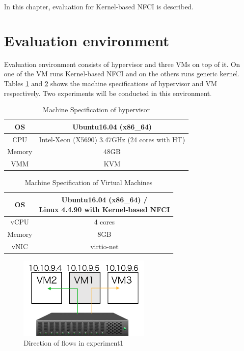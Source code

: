 In this chapter, evaluation for Kernel-based NFCI is described. 
\section{Evaluation environment}
Evaluation environment consists of hypervisor and three VMs on top of it. On one of the VM runs Kernel-based NFCI and on the others runs generic kernel. Tables \ref{tbl: spec1} and \ref{tbl: spec2} shows the machine specifications of hypervisor and VM respectively. Two experiments will be conducted in this environment.  

\begin{table}
	\centering
	\begin{tabular}{|c||c|}
		\hline
		OS & Ubuntu16.04 (x86\_64) \\
		\hline
		CPU & Intel-Xeon (X5690) 3.47GHz (24 cores with HT) \\
		\hline
		Memory & 48GB \\
		\hline
		VMM & KVM \\
		\hline
	\end{tabular}
	\caption{Machine Specification of hypervisor}
	\label{tbl: spec1}
\end{table}

\begin{table}
	\centering
	\begin{tabular}{|c||c|}
		\hline
		OS &  \shortstack{Ubuntu16.04 (x86\_64) / \\ Linux 4.4.90 with Kernel-based NFCI} \tabularnewline
		\hline
		vCPU & 4 cores \tabularnewline
		\hline
		Memory & 8GB \tabularnewline
		\hline
		vNIC & virtio-net \tabularnewline
		\hline
	\end{tabular}
	\caption{Machine Specification of Virtual Machines} 
	\label{tbl: spec2}
\end{table}

\begin{figure}
	\centering
	\includegraphics[width=65mm]{pics/env1.pdf}
	\caption{Direction of flows in experiment1}
	\label{fig: exp1}
\end{figure}

